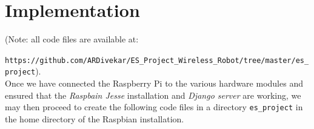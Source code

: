 \section{Implementation}
	(Note: all code files are available at:
	
	\texttt{https://github.com/ARDivekar/ES\_Project\_Wireless\_Robot/tree/master/es\_project}).
	\\
	
	Once we have connected the Raspberry Pi to the various hardware modules and ensured that the \textit{Raspbain Jesse} installation and \textit{Django server} are working, we may then proceed to create the following code files in a directory \texttt{es\_project} in the home directory of the Raspbian installation. 
	

	
